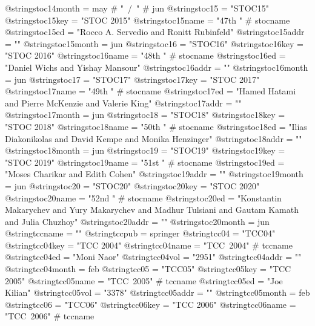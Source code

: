 @string{stoc14month =           may # "~/~" # jun}
@string{stoc15 =                "STOC15"}
@string{stoc15key =             "STOC 2015"}
@string{stoc15name =            "47th " # stocname}
@string{stoc15ed =              "Rocco A. Servedio and Ronitt Rubinfeld"}
@string{stoc15addr =            ""}
@string{stoc15month =           jun}
@string{stoc16 =                "STOC16"}
@string{stoc16key =             "STOC 2016"}
@string{stoc16name =            "48th " # stocname}
@string{stoc16ed =              "Daniel Wichs and Yishay Mansour"}
@string{stoc16addr =            ""}
@string{stoc16month =           jun}
@string{stoc17 =                "STOC17"}
@string{stoc17key =             "STOC 2017"}
@string{stoc17name =            "49th " # stocname}
@string{stoc17ed =              "Hamed Hatami and Pierre McKenzie and Valerie King"}
@string{stoc17addr =            ""}
@string{stoc17month =           jun}
@string{stoc18 =                "STOC18"}
@string{stoc18key =             "STOC 2018"}
@string{stoc18name =            "50th " # stocname}
@string{stoc18ed =              "Ilias Diakonikolas and David Kempe and Monika Henzinger"}
@string{stoc18addr =            ""}
@string{stoc18month =           jun}
@string{stoc19 =                "STOC19"}
@string{stoc19key =             "STOC 2019"}
@string{stoc19name =            "51st " # stocname}
@string{stoc19ed =              "Moses Charikar and Edith Cohen"}
@string{stoc19addr =            ""}
@string{stoc19month =           jun}
@string{stoc20 =                "STOC20"}
@string{stoc20key =             "STOC 2020"}
@string{stoc20name =            "52nd " # stocname}
@string{stoc20ed =              "Konstantin Makarychev and Yury Makarychev and Madhur Tulsiani and Gautam Kamath and Julia Chuzhoy"}
@string{stoc20addr =            ""}
@string{stoc20month =           jun}
@string{tccname =               ""}
@string{tccpub =                springer}
@string{tcc04 =                 "TCC04"}
@string{tcc04key =              "TCC 2004"}
@string{tcc04name =             "TCC~2004" # tccname}
@string{tcc04ed =               "Moni Naor"}
@string{tcc04vol =              "2951"}
@string{tcc04addr =             ""}
@string{tcc04month =            feb}
@string{tcc05 =                 "TCC05"}
@string{tcc05key =              "TCC 2005"}
@string{tcc05name =             "TCC~2005" # tccname}
@string{tcc05ed =               "Joe Kilian"}
@string{tcc05vol =              "3378"}
@string{tcc05addr =             ""}
@string{tcc05month =            feb}
@string{tcc06 =                 "TCC06"}
@string{tcc06key =              "TCC 2006"}
@string{tcc06name =             "TCC~2006" # tccname}
